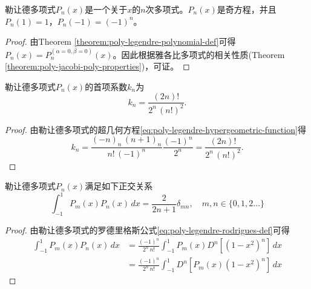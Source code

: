 \begin{subappendices}
\begin{theorem}
  勒让德多项式$P_n(x)$是一个关于$x$的$n$次多项式。$P_n(x)$是奇方程，并且$P_n(1)=1$，$P_n(-1) = (-1)^n$。
\end{theorem}
\begin{proof}
  由Theorem \ref{theorem:poly-legendre-polynomial-def}可得$P_n(x) =P^{(\alpha=0, \beta=0)}_n(x)$。因此根据雅各比多项式的相关性质(Theorem \ref{theorem:poly-jacobi-poly-properties})，可证。
\end{proof}

\begin{theorem}[勒让德多项式的首项系数]
  勒让德多项式$P_n(x)$的首项系数$k_n$为
  \begin{equation}
    \label{eq:poly-legendre-leading-coefficient}
    k_n = \frac{(2n)!}{2^n \, (n!)^2}.
  \end{equation}
\end{theorem}
\begin{proof}
  由勒让德多项式的超几何方程\eqref{eq:poly-legendre-hypergeometric-function}得
  \begin{equation*}
    k_n = \frac{(-n)_n \, (n+1)_n}{n! \, (-1)^n} \frac{(-1)^n}{2^n} = \frac{(2n)!}{2^n \, (n!)^2}.
  \end{equation*}
\end{proof}

\begin{theorem}[勒让德多项式的正交条件]
  勒让德多项式$P_n(x)$满足如下正交关系
  \begin{equation}
    \label{eq:poly-legendre-orthogonality-condition}
    \int_{-1}^{1} P_m(x) P_n(x) \, dx = \frac{2}{2n+1} \delta_{mn}, \quad m,n \in \{0,1,2\ldots\}
  \end{equation}
\end{theorem}
\begin{proof}
  由勒让德多项式的罗德里格斯公式\eqref{eq:poly-legendre-rodrigues-def}可得
  \begin{equation*}
    \begin{split}
      \int_{-1}^{1}P_m(x) P_n(x) \, dx &= \frac{(-1)^n}{2^n \, n!} \int_{-1}^{1} P_m(x) D^n \left[ (1-x^2)^n \right] \, dx \\
      &= \frac{(-1)^n}{2^n \, n!} \int_{-1}^{1} D^n \left[ P_m(x)  (1-x^2)^n \right] \, dx
    \end{split}
  \end{equation*}


\end{proof}
\end{subappendices}
